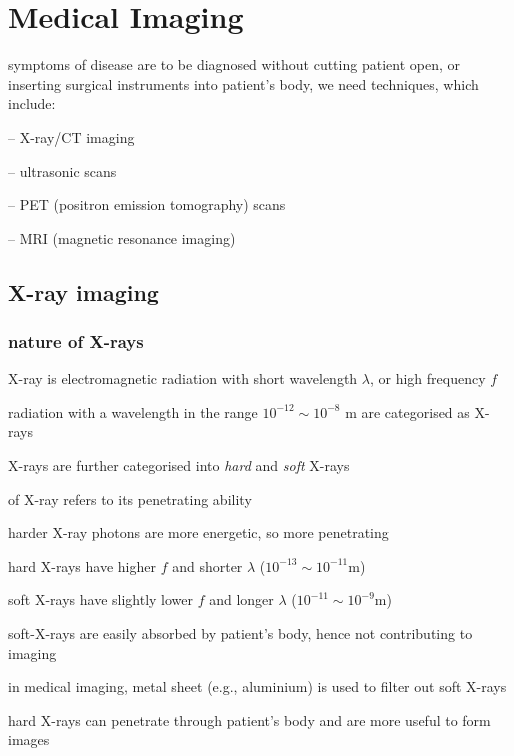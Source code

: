 \section{Medical Imaging}

symptoms of disease are to be diagnosed without cutting patient open, or inserting surgical instruments into patient's body, we need  techniques, which include:

\begin{compactitem}
	\item[--] X-ray/CT imaging
	\item[--] ultrasonic scans
	\item[--] PET (positron emission tomography) scans
	\item[--] MRI (magnetic resonance imaging)
\end{compactitem}

\subsection{X-ray imaging}

\subsubsection{nature of X-rays}

X-ray is electromagnetic radiation with short wavelength $\lambda$, or high frequency $f$

radiation with a wavelength in the range $10^{-12}\sim10^{-8}\text{ m}$ are categorised as X-rays

\cmt X-rays are further categorised into \emph{hard} and \emph{soft} X-rays

 of X-ray refers to its penetrating ability

harder X-ray photons are more energetic, so more penetrating
	
hard X-rays have higher $f$ and shorter $\lambda$ ($10^{-13}\sim10^{-11}$m)
	
soft X-rays have slightly lower $f$ and longer $\lambda$ ($10^{-11}\sim10^{-9}$m)

\cmt soft-X-rays are easily absorbed by patient's body, hence not contributing to imaging

in medical imaging, metal sheet (e.g., aluminium) is used to filter out soft X-rays
	
hard X-rays can penetrate through patient's body and are more useful to form images
	
